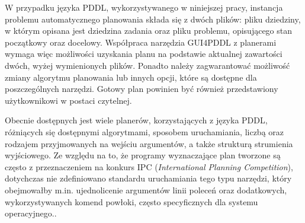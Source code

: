 W przypadku języka PDDL, wykorzystywanego w niniejszej pracy, instancja problemu automatycznego planowania składa się z dwóch plików: pliku dziedziny, w którym opisana jest dziedzina zadania oraz pliku problemu, opisującego stan początkowy oraz docelowy. Współpraca narzędzia GUI4PDDL z planerami wymaga więc możliwości uzyskania planu na podstawie aktualnej zawartości dwóch, wyżej wymienionych plików. Ponadto należy zagwarantować możliwość zmiany algorytmu planowania lub innych opcji, które są dostępne dla poszczególnych narzędzi. Gotowy plan powinien być również przedstawiony użytkownikowi w postaci czytelnej.

Obecnie dostępnych jest wiele planerów, korzystających z języka PDDL, różniących się dostępnymi algorytmami, sposobem uruchamiania, liczbą oraz rodzajem przyjmowanych na wejściu argumentów, a także strukturą strumienia wyjściowego. Ze względu na to, że programy wyznaczające plan tworzone są często z przeznaczeniem na konkurs IPC (\emph{International Planning Competition}), dotychczas nie zdefiniowano standardu uruchamiania tego typu narzędzi, który obejmowałby m.in. ujednolicenie argumentów linii poleceń oraz dodatkowych, wykorzystywanych komend powłoki, często specyficznych dla systemu operacyjnego..

